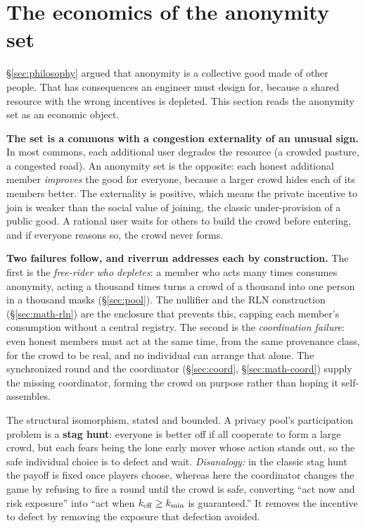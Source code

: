 \documentclass[11pt]{article}
\begin{document}
\section{The economics of the anonymity set}
\label{sec:economics}

\S\ref{sec:philosophy} argued that anonymity is a collective good made of other people.
That has consequences an engineer must design for, because a shared resource with the
wrong incentives is depleted. This section reads the anonymity set as an economic object.

\textbf{The set is a commons with a congestion externality of an unusual sign.} In most
commons, each additional user degrades the resource (a crowded pasture, a congested road).
An anonymity set is the opposite: each honest additional member \emph{improves} the good
for everyone, because a larger crowd hides each of its members better. The externality is
positive, which means the private incentive to join is weaker than the social value of
joining, the classic under-provision of a public good. A rational user waits for others to
build the crowd before entering, and if everyone reasons so, the crowd never forms.

\textbf{Two failures follow, and riverrun addresses each by construction.} The first is
the \emph{free-rider who depletes}: a member who acts many times consumes anonymity, acting
a thousand times turns a crowd of a thousand into one person in a thousand masks
(\S\ref{sec:pool}). The nullifier and the RLN construction (\S\ref{sec:math-rln}) are the
enclosure that prevents this, capping each member's consumption without a central
registry. The second is the \emph{coordination failure}: even honest members must act at
the same time, from the same provenance class, for the crowd to be real, and no individual
can arrange that alone. The synchronized round and the coordinator (\S\ref{sec:coord},
\S\ref{sec:math-coord}) supply the missing coordinator, forming the crowd on purpose rather
than hoping it self-assembles.

\begin{intuition}
The structural isomorphism, stated and bounded. A privacy pool's participation problem is a
\textbf{stag hunt}: everyone is better off if all cooperate to form a large crowd, but each
fears being the lone early mover whose action stands out, so the safe individual choice is
to defect and wait. \emph{Disanalogy:} in the classic stag hunt the payoff is fixed once
players choose, whereas here the coordinator changes the game by refusing to fire a round
until the crowd is safe, converting ``act now and risk exposure'' into ``act when
$k_{\mathrm{eff}} \ge k_{\min}$ is guaranteed.'' It removes the incentive to defect by removing the
exposure that defection avoided.
\end{intuition}
\end{document}
